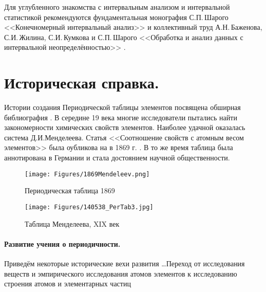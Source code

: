 \documentclass[a5paper,openany]{book}
\begin{document}
Для углубленного знакомства с интервальным анализом и интервальной статистикой рекомендуются фундаментальная монография С.П.\,Шарого <<Конечномерный интервальный анализ>> \cite{SharyBook} и коллективный труд А.Н.\,Баженова, С.И.\,Жилина, С.И.\,Кумкова и С.П.\,Шарого <<Обработка и анализ данных с интервальной неопределённостью>> \cite{BookIntStat}.

\section{Историческая справка.}

Истории создания Периодической таблицы элементов посвящена обширная библиография \cite{Trifonov1974, Scerri2019}.
В середине 19 века многие исследователи пытались найти закономерности химических свойств элементов. Наиболее удачной оказалась система Д.И.Менделеева. Статья <<Соотношение свойств с атомным весом элементов>> была оубликова на в 1869 г. \cite{Mendeleev1869ru}. В то же время таблица была аннотирована в Германии \cite{Mendeleev1869} и стала достоянием научной общественности.

\begin{figure}[ht] 
	\centering\small
	\unitlength=1mm
	\texttt{[image: Figures/1869Mendeleev.png]} 
	\caption{Периодическая таблица 1869 \cite{Mendeleev1869}} 
	\label{f:1869Mendeleev}
\end{figure}	

\begin{figure}[h] 
	\centering\small
	\unitlength=1mm
	\texttt{[image: Figures/140538\_PerTab3.jpg]} 
	\caption{Таблица Менделеева, XIX век \cite{MendeleevTable} }
	\label{f:MendeleevTable}
\end{figure}


\paragraph{Развитие учения о периодичности.}
Приведём некоторые исторические вехи развития \cite{Trifonov1974, Scerri2019, Bekman} \ldots Переход от исследования веществ и эмпирического исследования атомов элементов к исследованию строения атомов и элементарных частиц
\end{document}
